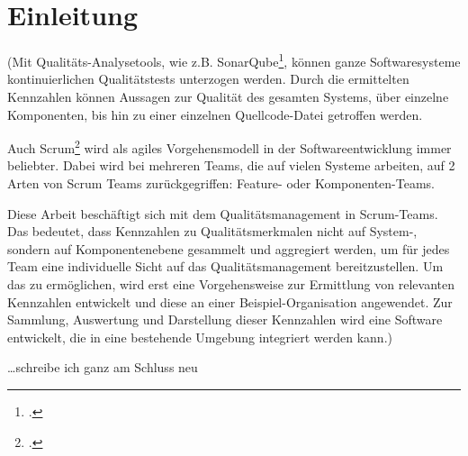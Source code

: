 \chapter{Einleitung}

(Mit Qualitäts-Analysetools, wie z.B. SonarQube\footcite{sonarqube}, können ganze Softwaresysteme kontinuierlichen Qualitätstests unterzogen werden.
Durch die ermittelten Kennzahlen können Aussagen zur Qualität des gesamten Systems, über einzelne Komponenten, bis hin zu einer einzelnen Quellcode-Datei getroffen werden.

Auch Scrum\footcite{scrum} wird als agiles Vorgehensmodell in der Softwareentwicklung immer beliebter. 
Dabei wird bei mehreren Teams, die auf vielen Systeme arbeiten, auf 2 Arten von Scrum Teams zurückgegriffen:
Feature- oder Komponenten-Teams.

Diese Arbeit beschäftigt sich mit dem Qualitätsmanagement in Scrum-Teams.
Das bedeutet, dass Kennzahlen zu Qualitätsmerkmalen nicht auf System-, sondern auf Komponentenebene gesammelt und aggregiert werden, um für jedes Team eine individuelle Sicht auf das Qualitätsmanagement bereitzustellen.
Um das zu ermöglichen, wird erst eine Vorgehensweise zur Ermittlung von relevanten Kennzahlen entwickelt und diese an einer Beispiel-Organisation angewendet.
Zur Sammlung, Auswertung und Darstellung dieser Kennzahlen wird eine Software entwickelt, die in eine bestehende Umgebung integriert werden kann.)

\ldots schreibe ich ganz am Schluss neu
